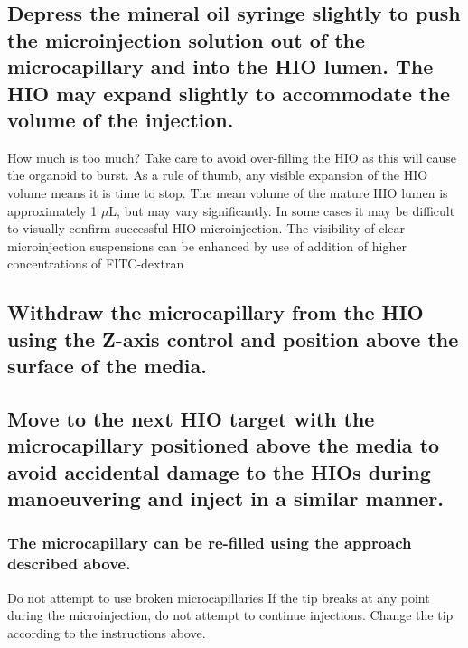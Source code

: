 \documentclass[11pt]{article}
\begin{document}
\subsection{{\sffamily } Depress the mineral oil syringe slightly to push the microinjection solution out of the microcapillary and into the HIO lumen. The HIO may expand slightly to accommodate the volume of the injection.}
\label{sec:orgheadline52}
\begin{bclogo}[logo=\bcinfo, couleurBarre=Black, noborder=true, couleur=gray!10]{     How much is too much?}
Take care to avoid over-filling the HIO as this will cause the organoid to burst. As a rule of thumb, any visible expansion of the HIO volume means it is time to stop. The mean volume of the mature HIO lumen is approximately 1 \(\mu\)L, but may vary significantly. In some cases it may be difficult to visually confirm successful HIO microinjection. The visibility of clear microinjection suspensions can be enhanced by use of addition of higher concentrations of FITC-dextran\\
\end{bclogo}
\subsection{{\sffamily } Withdraw the microcapillary from the HIO using the Z-axis control and position above the surface of the media.}
\label{sec:orgheadline53}
\subsection{{\sffamily } Move to the next HIO target with the microcapillary positioned above the media to avoid accidental damage to the HIOs during manoeuvering and inject in a similar manner.}
\label{sec:orgheadline55}
\subsubsection{{\sffamily } The microcapillary can be re-filled using the approach described above.}
\label{sec:orgheadline54}
\begin{bclogo}[logo=\bcinfo, couleurBarre=Black, noborder=true, couleur=gray!10]{     Do not attempt to  use broken microcapillaries}
If the tip breaks at any point during the microinjection, do not attempt to continue injections. Change the tip according to the instructions above.\\
\end{bclogo}
\end{document}
